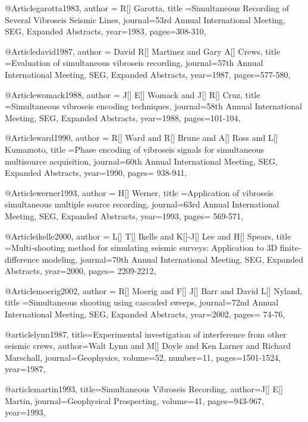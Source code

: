 {%
@Article{garotta1983,
  author = {R[] Garotta},
  title ={Simultaneous Recording of Several Vibroseis Seismic Lines},
  journal={53rd Annual International Meeting, SEG, Expanded Abstracts},
  year=1983,
  pages={308-310},
}

@Article{david1987,
  author = {David R[] Martinez and Gary A[] Crews},
  title ={Evaluation of simultaneous vibroseis recording},
  journal={57th Annual International Meeting, SEG, Expanded Abstracts},
  year=1987,
  pages={577-580},
}

@Article{womack1988,
  author = {J[] E[] Womack and J[] R[] Cruz},
  title ={Simultaneous vibroseis encoding techniques},
  journal={58th Annual International Meeting, SEG, Expanded Abstracts},
  year=1988,
  pages={101-104},
}

@Article{ward1990,
  author = {R[] Ward and R[] Brune and A[] Ross and L[] Kumamoto},
  title ={Phase encoding of vibroseis signals for simultaneous multisource acquisition},
  journal={60th Annual International Meeting, SEG, Expanded Abstracts},
  year=1990,
  pages={ 938-941},
}

@Article{werner1993,
  author = {H[] Werner},
  title ={Application of vibroseis simultaneous multiple source recording},
  journal={63rd Annual International Meeting, SEG, Expanded Abstracts},
  year=1993,
  pages={ 569-571},
}

@Article{ikelle2000,
  author = {L[] T[] Ikelle and K[]-J[] Lee and H[] Spears},
  title ={Multi‐shooting method for simulating seismic surveys: Application to 3D finite‐difference modeling},
  journal={70th Annual International Meeting, SEG, Expanded Abstracts},
  year=2000,
  pages={ 2209-2212},
}

@Article{moerig2002,
  author = {R[] Moerig and F[] J[] Barr and David L[] Nyland},
  title ={Simultaneous shooting using cascaded sweeps},
  journal={72nd Annual International Meeting, SEG, Expanded Abstracts},
  year=2002,
  pages={ 74-76},
}





@article{lynn1987,
  title={Experimental investigation of interference from other seismic crews},
  author={Walt Lynn and M[] Doyle and Ken Larner and Richard Marschall},
  journal={Geophysics},
  volume={52},
  number={11},
  pages={1501-1524},
  year={1987},
}


@article{martin1993,
  title={Simultaneous Vibroseis Recording},
  author={J[] E[] Martin},
  journal={Geophysical Prospecting},
  volume={41},
  pages={943-967},
  year={1993},
}


}
